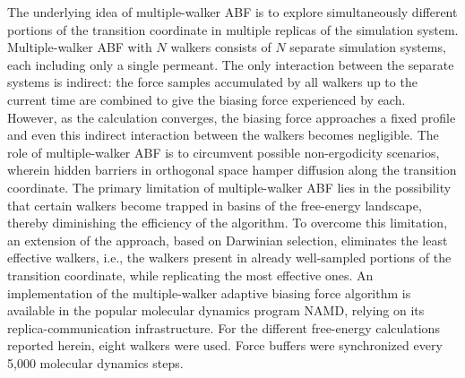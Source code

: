  {\color{red} The underlying idea of multiple-walker ABF is to explore simultaneously different portions of the transition coordinate in multiple replicas of the simulation system.
Multiple-walker ABF with $N$ walkers consists of $N$ separate simulation systems, each including only a single permeant. The only interaction between the separate systems is indirect: the force samples accumulated by all walkers up to the current time are combined to give the biasing force experienced by each. However, as the calculation converges, the biasing force approaches a fixed profile and even this indirect interaction between the walkers becomes negligible. The role of multiple-walker ABF is to circumvent possible non-ergodicity scenarios, wherein hidden barriers in orthogonal space hamper diffusion along the transition coordinate. The primary limitation of multiple-walker ABF lies in the possibility that certain walkers become trapped in basins of the free-energy landscape, thereby diminishing the efficiency of the algorithm.
To overcome this limitation, an extension of the approach, based on
Darwinian selection, eliminates the least effective walkers, i.e., the walkers
present in already well-sampled portions of the transition coordinate,
while replicating
the most effective ones\cite{Minoukadeh2010,Comer2014c}.}
An implementation of the multiple-walker adaptive biasing force algorithm is available in the  popular molecular dynamics program NAMD\cite{Phillips2005}, relying on its replica-communication infrastructure. For the different free-energy calculations reported herein, eight walkers were used. Force buffers were synchronized every 5,000 molecular dynamics steps.  

